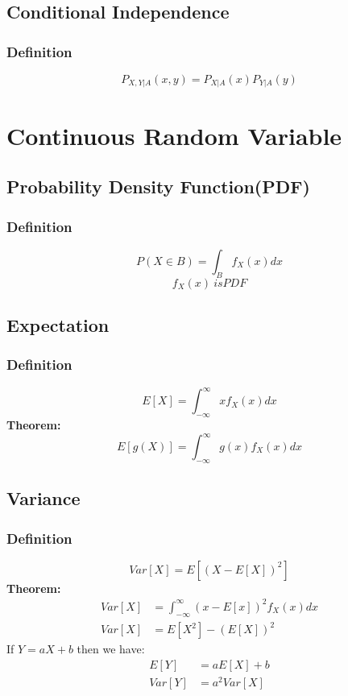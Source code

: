 \documentclass[11pt]{article}
\begin{document}
\subsection{Conditional Independence}
\subsubsection{Definition}
$$P_{X,Y|A}(x,y) = P_{X|A}(x)P_{Y|A}(y)$$

\section{Continuous Random Variable}
\subsection{Probability Density Function(PDF)}
\subsubsection{Definition}
$$P(X\in B) = \int_{B} f_X(x) dx$$
$$f_X(x)\ is PDF$$

\subsection{Expectation}
\subsubsection{Definition}
$$E[X] = \int_{-\infty}^{\infty} xf_X(x)dx$$
\noindent \textbf{Theorem:}\\
$$E[g(X)] = \int_{-\infty}^{\infty} g(x)f_X(x)dx$$

\subsection{Variance}
\subsubsection{Definition}
$$Var[X] = E[(X-E[X])^2]$$
\noindent \textbf{Theorem:}\\
\begin{equation*}
    \begin{split}
        Var[X] & = \int_{-\infty}^{\infty} (x-E[x])^2 f_X(x)dx\\
        Var[X] & = E[X^2] -(E[X])^2
    \end{split}
\end{equation*}
\indent \indent If $Y = aX + b$ then we have:
\begin{equation*}
    \begin{split}
        E[Y] & = aE[X] + b \\
        Var[Y] & = a^2Var[X]
    \end{split}
\end{equation*}
\end{document}
